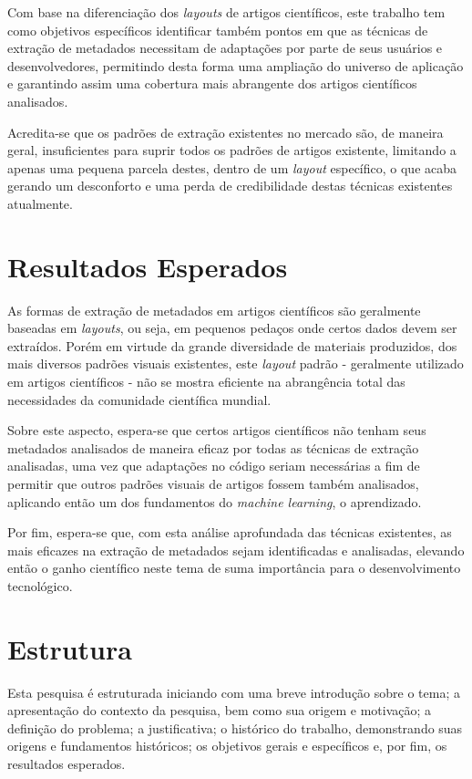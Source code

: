 Com base na diferenciação dos \textit{layouts} de artigos científicos, este trabalho tem como objetivos específicos identificar também pontos em que as técnicas de extração de metadados necessitam de adaptações por parte de seus usuários e desenvolvedores, permitindo desta forma uma ampliação do universo de aplicação e garantindo assim uma cobertura mais abrangente dos artigos científicos analisados.

Acredita-se que os padrões de extração existentes no mercado são, de maneira geral, insuficientes para suprir todos os padrões de artigos existente, limitando a apenas uma pequena parcela destes, dentro de um \textit{layout} específico, o que acaba gerando um desconforto e uma perda de credibilidade destas técnicas existentes atualmente.

\section{Resultados Esperados}

As formas de extração de metadados em artigos científicos são geralmente baseadas em \textit{layouts}, ou seja, em pequenos pedaços onde certos dados devem ser extraídos. Porém em virtude da grande diversidade de materiais produzidos, dos mais diversos padrões visuais existentes, este \textit{layout} padrão - geralmente utilizado em artigos científicos - não se mostra eficiente na abrangência total das necessidades da comunidade científica mundial. 

Sobre este aspecto, espera-se que certos artigos científicos não tenham seus metadados analisados de maneira eficaz por todas as técnicas de extração analisadas, uma vez que adaptações no código seriam necessárias a fim de permitir que outros padrões visuais de artigos fossem também analisados, aplicando então um dos fundamentos do \textit{machine learning}, o aprendizado. 

Por fim, espera-se que, com esta análise aprofundada das técnicas existentes, as mais eficazes na extração de metadados sejam identificadas e analisadas, elevando então o ganho científico neste tema de suma importância para o desenvolvimento tecnológico.

\section{Estrutura}

Esta pesquisa é estruturada iniciando com uma breve introdução sobre o tema; a apresentação do contexto da pesquisa, bem como sua origem e motivação; a definição do problema; a justificativa; o histórico do trabalho, demonstrando suas origens e fundamentos históricos; os objetivos gerais e específicos e, por fim, os resultados esperados.

